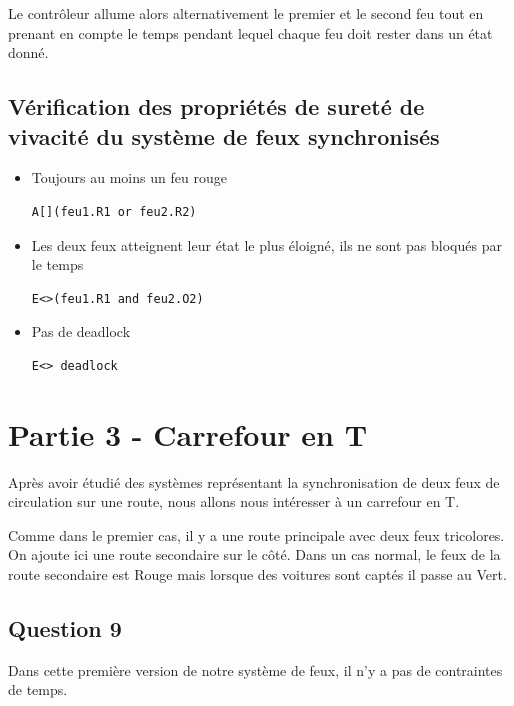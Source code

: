 \documentclass[pdftex,12pt,a4paper]{article}
\begin{document}
Le contrôleur allume alors alternativement le premier et le second feu tout en prenant en compte le temps pendant lequel chaque feu doit rester dans un état donné.

\subsection*{Vérification des propriétés de sureté de vivacité du système de feux synchronisés}

\begin{itemize}
	\item Toujours au moins un feu rouge
\begin{verbatim}
A[](feu1.R1 or feu2.R2)
\end{verbatim}

	\item Les deux feux atteignent leur état le plus éloigné, ils ne sont pas bloqués par le temps
\begin{verbatim}
E<>(feu1.R1 and feu2.O2)
\end{verbatim}

	\item Pas de deadlock
\begin{verbatim}
E<> deadlock
\end{verbatim}

\end{itemize}

\section{Partie 3 - Carrefour en T}
Après avoir étudié des systèmes représentant la synchronisation de deux feux de circulation sur une route, nous allons nous intéresser à un carrefour en T.

Comme dans le premier cas, il y a une route principale avec deux feux tricolores. On ajoute ici une route secondaire sur le côté. Dans un cas normal, le feux de la route secondaire est Rouge mais lorsque des voitures sont captés il passe au Vert.

\subsection{Question 9}

Dans cette première version de notre système de feux, il n'y a pas de contraintes de temps.
\end{document}

